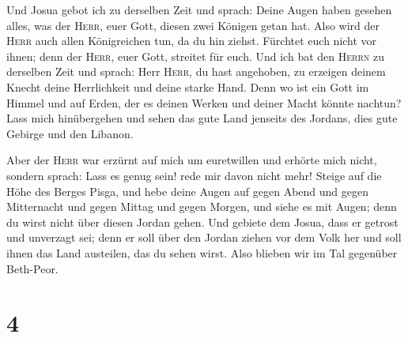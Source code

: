  Und Josua gebot ich zu derselben Zeit und sprach: Deine
Augen haben gesehen alles, was der \textsc{Herr}, euer Gott, diesen zwei
Königen getan hat. Also wird der \textsc{Herr} auch allen Königreichen
tun, da du hin ziehst.  Fürchtet euch nicht vor ihnen;
denn der \textsc{Herr}, euer Gott, streitet für euch. 
Und ich bat den \textsc{Herrn} zu derselben Zeit und sprach:
 Herr \textsc{Herr}, du hast angehoben, zu erzeigen
deinem Knecht deine Herrlichkeit und deine starke Hand. Denn wo ist ein
Gott im Himmel und auf Erden, der es deinen Werken und deiner Macht
könnte nachtun?  Lass mich hinübergehen und sehen das
gute Land jenseits des Jordans, dies gute Gebirge und den Libanon.

 Aber der \textsc{Herr} war erzürnt auf mich um
euretwillen und erhörte mich nicht, sondern sprach: Lass es genug sein!
rede mir davon nicht mehr!  Steige auf die Höhe des
Berges Pisga, und hebe deine Augen auf gegen Abend und gegen Mitternacht
und gegen Mittag und gegen Morgen, und siehe es mit Augen; denn du wirst
nicht über diesen Jordan gehen.  Und gebiete dem Josua,
dass er getrost und unverzagt sei; denn er soll über den Jordan ziehen
vor dem Volk her und soll ihnen das Land austeilen, das du sehen wirst.
 Also blieben wir im Tal gegenüber Beth-Peor.

\hypertarget{section-3}{%
\section{4}\label{section-3}}

